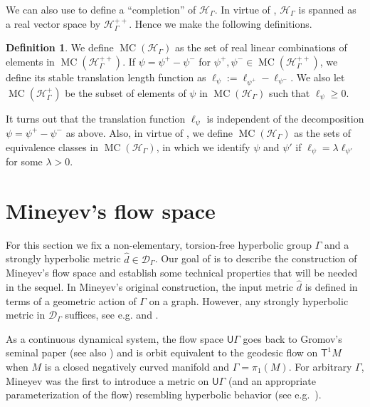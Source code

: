 \documentclass[twoside]{amsart}
\theoremstyle{definition}
\newtheorem{definition}[theorem]{Definition}
\numberwithin{equation}{section}
\numberwithin{theorem}{section}
\newcommand{\msf}[1]{\mathsf{#1}}
\newcommand{\calD}{\mathcal{D}}
\newcommand{\calH}{\mathcal{H}}
\newcommand{\scrH}{\mathscr{H}}
\newcommand{\G}{\Gamma}
\newcommand{\lam}{\lambda}
\newcommand{\p}{\psi}
\newcommand{\UG}{\msf{U}\G}
\DeclareMathOperator{\MC}{MC}
\begin{document}
We can also use  to define a ``completion'' of $\calH_\G$. In virtue of \cite[Proposition~3.8]{CRS}, $\calH_\G$ is spanned as a real vector space by $\calH_\G^{++}$. Hence we make the following definitions.

\begin{definition}\label{def:MCH}
    We define $\MC(\calH_\G)$ as the set of real linear combinations of elements in $\MC(\calH_\G^{++})$. If $\p=\p^+-\p^-$ for $\p^+,\p^-\in \MC(\calH_\G^{++})$, we define its stable translation length function as $\ell_\p:=\ell_{\p^+}-\ell_{\p^-}$. We also let $\MC(\calH_\G^{+})$ be the subset of elements of $\p$ in $\MC(\calH_\G)$ such that $\ell_\p\geq 0$.
\end{definition}

It turns out that the translation function $\ell_\p$ is independent of the decomposition $\p=\p^+-\p^-$ as above. Also, in virtue of , we define $\MC(\scrH_\G)$ as the sets of equivalence classes in $\MC(\calH_\G)$, in which we identify $\p$ and $\p'$ if $\ell_\p=\lam\ell_{\p'}$ for some $\lam>0$. 

\section{Mineyev's flow space}\label{sec:mineyevflow}
For this section we fix a non-elementary, torsion-free hyperbolic group $\G$ and a strongly hyperbolic metric $\hat d\in \calD_\G$. Our goal of is to describe the construction of Mineyev's flow space \cite{mineyev.flow} and establish some technical properties that will be needed in the sequel. In Mineyev's original construction, the input metric $\hat{d}$ is defined in terms of a geometric action of $\G$ on a graph. However, any strongly hyperbolic metric in $\calD_\G$ suffices, see e.g. \cite[Section~3]{tanaka.topflows} and \cite[Section~5]{dilsavor}.

 As a continuous dynamical system, the flow space $\UG$ goes back to Gromov's seminal paper \cite{gromov.hypgroups} (see also \cite{matheus,champetier}) and is orbit equivalent to the geodesic flow on $\msf{T}^1 M$ when $M$ is a closed negatively curved manifold and $\G=\pi_1(M)$. For arbitrary $\G$, Mineyev \cite{mineyev.flow} was the first to introduce a metric on $\UG$ (and an appropriate parameterization of the flow) resembling hyperbolic behavior (see e.g.~). 
\end{document}
